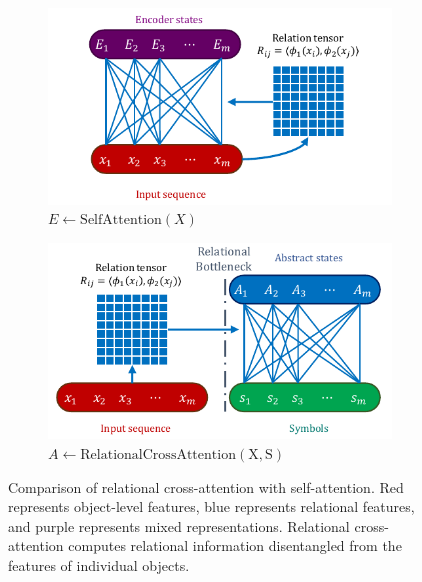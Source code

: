\begin{figure}
    \begin{subfigure}[b]{0.5\textwidth}
        \centering
        \includegraphics[width=\textwidth]{figures/self_attn_fig.pdf}
        \caption{$E \gets \mathrm{SelfAttention}(X)$}\label{fig:self_attention}
    \end{subfigure}
    \hfill
    \begin{subfigure}[b]{0.5\textwidth}
        \centering
        \includegraphics[width=\textwidth]{figures/rel_crossattn_fig.pdf}
        \caption{$A \gets \mathrm{RelationalCrossAttention(X, S)}$}\label{fig:relational_cross_attention}
    \end{subfigure}
    \caption{Comparison of relational cross-attention with self-attention. Red represents object-level features, blue represents relational features, and purple represents mixed representations. Relational cross-attention computes relational information disentangled from the features of individual objects.}\label{fig:attn_mechanisms}
    \vskip-15pt
\end{figure}

